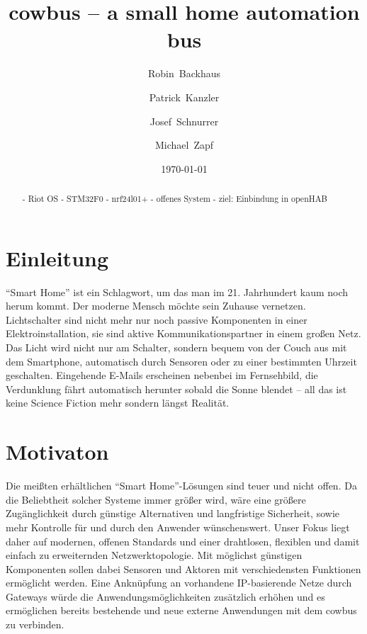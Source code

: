 \documentclass{IEEEtran}
\begin{document}
\title{cowbus -- a small home automation bus}
\author{Robin~Backhaus \and Patrick~Kanzler \and Josef~Schnurrer \and Michael~Zapf}
\date{\today}



\maketitle

\begin{abstract}
    - Riot OS
    - STM32F0
    - nrf24l01+
    - offenes System
    - ziel: Einbindung in openHAB
\end{abstract}


\section{Einleitung}
    \enquote{Smart Home} ist ein Schlagwort, um das man im 21. Jahrhundert
    kaum noch herum kommt. Der moderne Mensch möchte sein Zuhause vernetzen.
    Lichtschalter sind nicht mehr nur noch passive Komponenten in einer
    Elektroinstallation, sie sind aktive Kommunikationspartner in einem großen Netz.
    Das Licht wird nicht nur am Schalter, sondern bequem von der Couch aus mit dem
    Smartphone, automatisch durch Sensoren oder zu einer bestimmten Uhrzeit geschalten. 
    Eingehende E-Mails erscheinen nebenbei im Fernsehbild, die Verdunklung fährt 
    automatisch herunter sobald die Sonne blendet --
    all das ist keine Science Fiction mehr sondern längst Realität.

\section{Motivaton}
    Die meißten erhältlichen \enquote{Smart Home}-Lösungen sind teuer und nicht offen.
    Da die Beliebtheit solcher Systeme immer größer wird, wäre eine größere 
    Zugänglichkeit durch günstige Alternativen und langfristige Sicherheit, 
    sowie mehr Kontrolle für und durch den Anwender wünschenswert.
    Unser Fokus liegt daher auf modernen, offenen Standards und einer drahtlosen, 
    flexiblen und damit einfach zu erweiternden Netzwerktopologie.
    Mit möglichst günstigen Komponenten sollen dabei Sensoren und Aktoren 
    mit verschiedensten Funktionen ermöglicht werden.
    Eine Anknüpfung an vorhandene IP-basierende Netze durch Gateways würde die 
    Anwendungsmöglichkeiten zusätzlich erhöhen 
    und es ermöglichen bereits bestehende und neue externe Anwendungen mit dem 
    cowbus zu verbinden.
\end{document}
